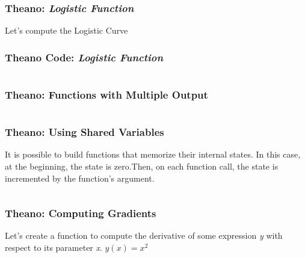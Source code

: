 \documentclass[aspectratio=169]{beamer}
\begin{document}
\begin{frame}
\frametitle{Theano: \textit{Logistic Function} }
Let's compute the Logistic Curve
\end{frame}

\begin{frame}
\frametitle{Theano Code: \emph{Logistic Function} }
\inputminted{python}{./aux_files/t7.py}
\end{frame}

\begin{frame}
\frametitle{Theano: Functions with Multiple Output}
\inputminted{python}{./aux_files/t8.py}
\end{frame}

\begin{frame}
\frametitle{Theano: Using Shared Variables}
It is possible to build functions that memorize their internal states. In this case, at the beginning, the state is  zero.Then, on each function call, the state is incremented by the function’s argument.
\inputminted{python}{./aux_files/t9.py}
\end{frame}

\begin{frame}
\frametitle{Theano: Computing Gradients }
Let's create a function to compute the derivative of some expression  \textit{y} with respect to its parameter \textit{x}.
$y(x) = x^{2}$
\inputminted{python}{./aux_files/t10.py}
\end{frame}
\end{document}

